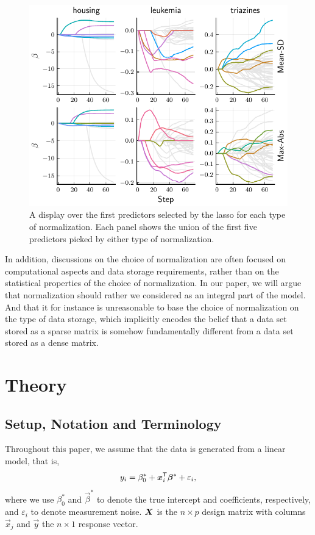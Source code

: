 \begin{figure}[bpt]
  \centering
  \includegraphics[]{plots/realdata_paths.pdf}
  \caption{%
    A display over the first predictors selected by the lasso for each type of normalization. Each panel shows the union of the first five predictors picked by either type of normalization.
  }
  \label{fig:realdata-paths}
\end{figure}

In addition, discussions on the choice of normalization are often focused on computational aspects and data storage requirements, rather than on the statistical properties of the choice of normalization. In our paper, we will argue that normalization should rather we considered as an integral part of the model. And that it for instance is unreasonable to base the choice of normalization on the type of data storage, which implicitly encodes the belief that a data set stored as a sparse matrix is somehow fundamentally different from a data set stored as a dense matrix.

\section{Theory}

\subsection{Setup, Notation and Terminology}

Throughout this paper, we assume that the data is generated from a linear model, that is,
\[
  y_i = \beta_0^* + \vec x_i^\T \vec\beta^* + \varepsilon_i,
\]
where we use \(\beta_0^*\) and \(\vec\beta^*\) to denote the true intercept and coefficients, respectively, and \(\varepsilon_i\) to denote measurement noise. \(\mat X\) is the \(n \times p\) design matrix with columns \(\vec x_j\) and \(\vec y\) the \(n \times 1\) response vector.

